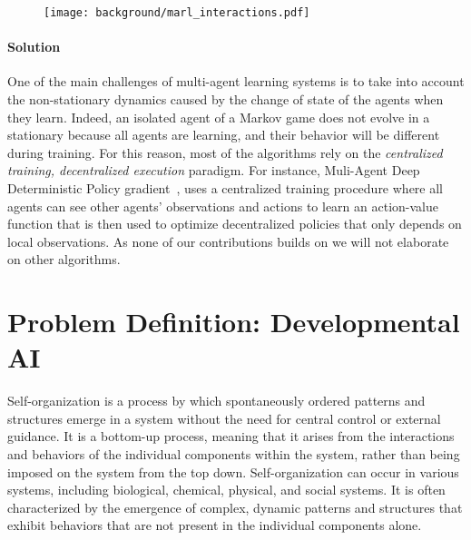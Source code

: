 \begin{figure}[!h]
\centering
\texttt{[image: background/marl\_interactions.pdf]}	
\caption{}
\label{fig:marl_interactions}
\end{figure}

\paragraph{Solution}

One of the main challenges of multi-agent learning systems is to take into account the non-stationary dynamics caused by the change of state of the agents when they learn. Indeed, an isolated agent of a Markov game does not evolve in a stationary \mdp because all agents are learning, and their behavior will be different during training. For this reason, most of the \marl algorithms rely on the \textit{centralized training, decentralized execution} paradigm. For instance, Muli-Agent Deep Deterministic Policy gradient~\citep{lowe2017multi}, uses a centralized training procedure where all agents can see other agents' observations and actions to learn an action-value function that is then used to optimize decentralized policies that only depends on local observations. As none of our contributions builds on \marl we will not elaborate on other \marl algorithms.



\section{Problem Definition: Developmental AI}


\gls{Self-organization} is a process by which spontaneously ordered patterns and structures emerge in a system without the need for central control or external guidance. It is a bottom-up process, meaning that it arises from the interactions and behaviors of the individual components within the system, rather than being imposed on the system from the top down. Self-organization can occur in various systems, including biological, chemical, physical, and social systems. It is often characterized by the emergence of complex, dynamic patterns and structures that exhibit behaviors that are not present in the individual components alone.



